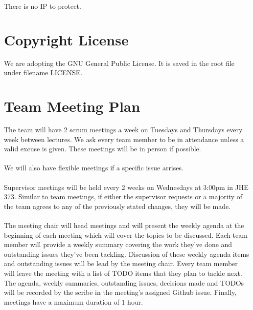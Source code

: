 \documentclass{article}
\begin{document}
There is no IP to protect.

\section{Copyright License}


We are adopting the GNU General Public License. It is saved in the root file under
filename LICENSE.

\section{Team Meeting Plan}





The team will have 2 scrum meetings a week on Tuesdays and Thursdays every week
between lectures. We ask every team member to be in attendance unless a valid
excuse is given. These meetings will be in person if possible.
\\
\\
We will also have flexible meetings if a specific issue arrises.
\\
\\
\indent Supervisor meetings will be held every 2 weeks on Wednesdays at 3:00pm in JHE 373. Similar to team meetings, if either the supervisor requests 
or a majority of the team agrees to any of the previously stated changes, 
they will be made.
\\
\\
\indent The meeting chair will head meetings and will present the weekly agenda at 
the beginning of each meeting which will cover the topics to be discussed. 
Each team member will provide a weekly summary covering the work they've 
done and outstanding issues they've been tackling. Discussion of these 
weekly agenda items and outstanding issues will be lead by the meeting 
chair. Every team member will leave the meeting with a list of TODO items 
that they plan to tackle next. The agenda, weekly summaries, outstanding 
issues, decisions made and TODOs will be recorded by the scribe in the 
meeting's assigned Github issue. Finally, meetings have a maximum duration of
1 hour.
\end{document}
